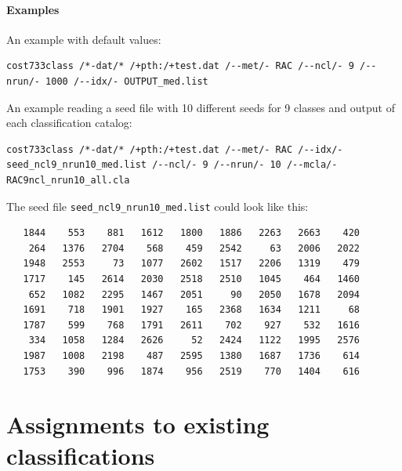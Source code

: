 \documentclass[12pt, oneside, a4paper, headsepline, plainheadsepline]{scrbook}
\begin{document}
\subsubsection*{Examples}
An example with default values:
\begin{lstlisting}
cost733class /*-dat/* /+pth:/+test.dat /--met/- RAC /--ncl/- 9 /--nrun/- 1000 /--idx/- OUTPUT_med.list
\end{lstlisting}
An example reading a seed file with 10 different seeds for 9 classes and output of each classification catalog:
\begin{lstlisting}
cost733class /*-dat/* /+pth:/+test.dat /--met/- RAC /--idx/- seed_ncl9_nrun10_med.list /--ncl/- 9 /--nrun/- 10 /--mcla/- RAC9ncl_nrun10_all.cla
\end{lstlisting}
The seed file \verb+seed_ncl9_nrun10_med.list+ could look like this:
\begin{lstlisting}
   1844    553    881   1612   1800   1886   2263   2663    420
    264   1376   2704    568    459   2542     63   2006   2022
   1948   2553     73   1077   2602   1517   2206   1319    479
   1717    145   2614   2030   2518   2510   1045    464   1460
    652   1082   2295   1467   2051     90   2050   1678   2094
   1691    718   1901   1927    165   2368   1634   1211     68
   1787    599    768   1791   2611    702    927    532   1616
    334   1058   1284   2626     52   2424   1122   1995   2576
   1987   1008   2198    487   2595   1380   1687   1736    614
   1753    390    996   1874    956   2519    770   1404    616
\end{lstlisting}

\chapter{Assignments to existing classifications}

\end{document}
